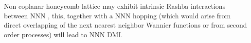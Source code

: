 Non-coplanar honeycomb lattice may exhibit intrinsic Rashba interactions between NNN \cite{Liu2011}, this, together with a NNN hopping (which would arise from direct overlapping of the next nearest neighbor Wannier functions or from second order processes) will lead to NNN DMI.











